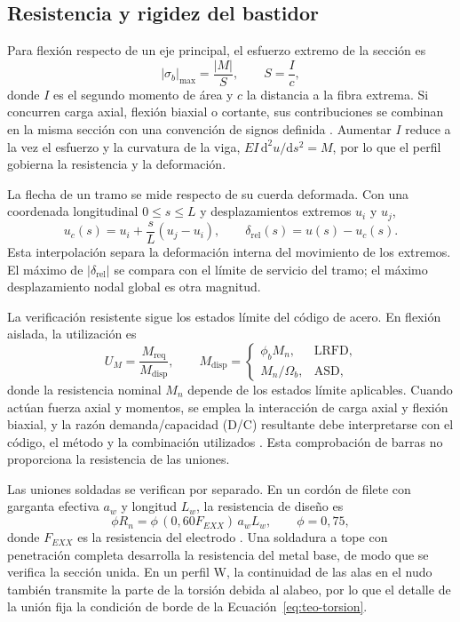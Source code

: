 \subsection{Resistencia y rigidez del bastidor}

Para flexión respecto de un eje principal, el esfuerzo extremo de la sección es
\begin{equation}
  |\sigma_b|_{\max}=\frac{|M|}{S},\qquad S=\frac{I}{c},
  \label{eq:mt-flexion}
\end{equation}
donde $I$ es el segundo momento de área y $c$ la distancia a la fibra extrema. Si concurren carga axial, flexión biaxial o cortante, sus contribuciones se combinan en la misma sección con una convención de signos definida \cite{shigley2015}. Aumentar $I$ reduce a la vez el esfuerzo y la curvatura de la viga, $EI\,\mathrm{d}^2u/\mathrm{d}s^2=M$, por lo que el perfil gobierna la resistencia y la deformación.

La flecha de un tramo se mide respecto de su cuerda deformada. Con una coordenada longitudinal $0\leq s\leq L$ y desplazamientos extremos $u_i$ y $u_j$,
\begin{equation}
  u_c(s)=u_i+\frac{s}{L}(u_j-u_i),\qquad
  \delta_{\mathrm{rel}}(s)=u(s)-u_c(s).
  \label{eq:mt-flecha}
\end{equation}
Esta interpolación separa la deformación interna del movimiento de los extremos. El máximo de $|\delta_{\mathrm{rel}}|$ se compara con el límite de servicio del tramo; el máximo desplazamiento nodal global es otra magnitud.

La verificación resistente sigue los estados límite del código de acero. En flexión aislada, la utilización es
\begin{equation}
  U_M=\frac{M_{\mathrm{req}}}{M_{\mathrm{disp}}},\qquad
  M_{\mathrm{disp}}=\begin{cases}
    \phi_bM_n,&\text{LRFD},\\
    M_n/\Omega_b,&\text{ASD},
  \end{cases}
  \label{eq:mt-utilizacion}
\end{equation}
donde la resistencia nominal $M_n$ depende de los estados límite aplicables. Cuando actúan fuerza axial y momentos, se emplea la interacción de carga axial y flexión biaxial, y la razón demanda/capacidad (D/C) resultante debe interpretarse con el código, el método y la combinación utilizados \cite{aisc360}. Esta comprobación de barras no proporciona la resistencia de las uniones.

Las uniones soldadas se verifican por separado. En un cordón de filete con garganta efectiva $a_w$ y longitud $L_w$, la resistencia de diseño es
\begin{equation}
  \phi R_n=\phi\,(0{,}60F_{EXX})\,a_wL_w,\qquad \phi=0{,}75,
  \label{eq:mt-filete}
\end{equation}
donde $F_{EXX}$ es la resistencia del electrodo \cite{aisc360}. Una soldadura a tope con penetración completa desarrolla la resistencia del metal base, de modo que se verifica la sección unida. En un perfil W, la continuidad de las alas en el nudo también transmite la parte de la torsión debida al alabeo, por lo que el detalle de la unión fija la condición de borde de la Ecuación~\eqref{eq:teo-torsion}.


